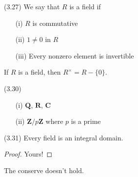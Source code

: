 \vspace{2ex}
\begin{defi}
 (3.27) We say that $R$ is a field if 
 \begin{itemize}
	 \item[(i)] $R$ is commutative
	 \item[(ii)] $1\ne 0$ in $R$ 
	 \item[(iii)] Every nonzero element is invertible
 \end{itemize}
\end{defi}
\vspace{2ex}
\begin{rmk}
If $R$ is a field, then $R^{\times }=R-\{0\}$.
\end{rmk}
\vspace{2ex}
\begin{ex}
 (3.30) 
 \begin{itemize}
	 \item[(i)] ${\bm Q}$, ${\bm R}$, ${\bm C}$
	 \item[(ii)] ${\bm Z}/p{\bm Z}$ where $p$ is a prime
 \end{itemize}
\end{ex}
\vspace{2ex}
\begin{prop}
 (3.31) Every field is an integral domain.
\end{prop}
\vspace{2ex}
\begin{proof}
Yours!
\end{proof}
\vspace{2ex}
\begin{rmk}
The conserve doesn't hold. 
\end{rmk}
\vspace{2ex}
 
